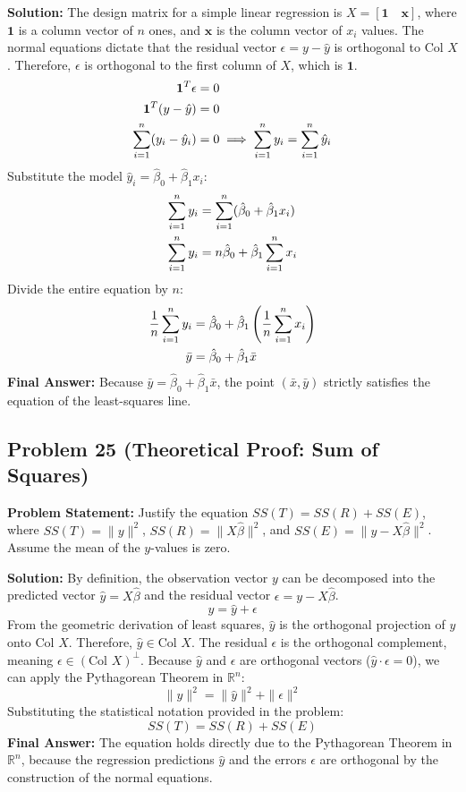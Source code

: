 \documentclass[11pt, letterpaper]{article}
\theoremstyle{definition}
\theoremstyle{remark}
\newcommand{\R}{\mathbb{R}}
\begin{document}
\textbf{Solution:}
The design matrix for a simple linear regression is $X = [\mathbf{1} \quad \mathbf{x}]$, where $\mathbf{1}$ is a column vector of $n$ ones, and $\mathbf{x}$ is the column vector of $x_i$ values.
The normal equations dictate that the residual vector $\epsilon = y - \hat{y}$ is orthogonal to $\text{Col } X$. Therefore, $\epsilon$ is orthogonal to the first column of $X$, which is $\mathbf{1}$.
\begin{align*}
\mathbf{1}^T \epsilon &= 0 \\ \relax
\mathbf{1}^T (y - \hat{y}) &= 0 \\ \relax
\sum_{i=1}^n (y_i - \hat{y}_i) &= 0 \implies \sum_{i=1}^n y_i = \sum_{i=1}^n \hat{y}_i
\end{align*}
Substitute the model $\hat{y}_i = \hat{\beta}_0 + \hat{\beta}_1 x_i$:
\begin{align*}
\sum_{i=1}^n y_i &= \sum_{i=1}^n (\hat{\beta}_0 + \hat{\beta}_1 x_i) \\ \relax
\sum_{i=1}^n y_i &= n\hat{\beta}_0 + \hat{\beta}_1 \sum_{i=1}^n x_i
\end{align*}
Divide the entire equation by $n$:
\begin{align*}
\frac{1}{n}\sum_{i=1}^n y_i &= \hat{\beta}_0 + \hat{\beta}_1 \left(\frac{1}{n}\sum_{i=1}^n x_i\right) \\ \relax
\bar{y} &= \hat{\beta}_0 + \hat{\beta}_1 \bar{x}
\end{align*}
\textbf{Final Answer:} Because $\bar{y} = \hat{\beta}_0 + \hat{\beta}_1 \bar{x}$, the point $(\bar{x}, \bar{y})$ strictly satisfies the equation of the least-squares line.

\subsection*{Problem 25 (Theoretical Proof: Sum of Squares)}
\textbf{Problem Statement:} Justify the equation $SS(T) = SS(R) + SS(E)$, where $SS(T) = \|y\|^2$, $SS(R) = \|X\hat{\beta}\|^2$, and $SS(E) = \|y - X\hat{\beta}\|^2$. Assume the mean of the $y$-values is zero.

\textbf{Solution:}
By definition, the observation vector $y$ can be decomposed into the predicted vector $\hat{y} = X\hat{\beta}$ and the residual vector $\epsilon = y - X\hat{\beta}$.
\[ y = \hat{y} + \epsilon \]
From the geometric derivation of least squares, $\hat{y}$ is the orthogonal projection of $y$ onto $\text{Col } X$. Therefore, $\hat{y} \in \text{Col } X$.
The residual $\epsilon$ is the orthogonal complement, meaning $\epsilon \in (\text{Col } X)^\perp$.
Because $\hat{y}$ and $\epsilon$ are orthogonal vectors ($\hat{y} \cdot \epsilon = 0$), we can apply the Pythagorean Theorem in $\R^n$:
\[ \|y\|^2 = \|\hat{y}\|^2 + \|\epsilon\|^2 \]
Substituting the statistical notation provided in the problem:
\[ SS(T) = SS(R) + SS(E) \]
\textbf{Final Answer:} The equation holds directly due to the Pythagorean Theorem in $\R^n$, because the regression predictions $\hat{y}$ and the errors $\epsilon$ are orthogonal by the construction of the normal equations.
\end{document}
